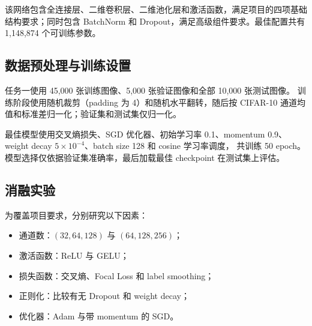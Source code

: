 \documentclass[UTF8,11pt,a4paper]{ctexart}
\begin{document}
该网络包含全连接层、二维卷积层、二维池化层和激活函数，满足项目的四项基础
结构要求；同时包含 BatchNorm 和 Dropout，满足高级组件要求。最佳配置共有
1,148,874 个可训练参数。

\subsection{数据预处理与训练设置}

任务一使用 45,000 张训练图像、5,000 张验证图像和全部 10,000 张测试图像。
训练阶段使用随机裁剪（padding 为 4）和随机水平翻转，随后按 CIFAR-10
通道均值和标准差归一化；验证集和测试集仅归一化。

最佳模型使用交叉熵损失、SGD 优化器、初始学习率 0.1、momentum 0.9、
weight decay $5\times10^{-4}$、batch size 128 和 cosine 学习率调度，
共训练 50 epoch。模型选择仅依据验证集准确率，最后加载最佳 checkpoint
在测试集上评估。

\subsection{消融实验}

为覆盖项目要求，分别研究以下因素：
\begin{itemize}
  \item 通道数：$(32,64,128)$ 与 $(64,128,256)$；
  \item 激活函数：ReLU 与 GELU；
  \item 损失函数：交叉熵、Focal Loss 和 label smoothing；
  \item 正则化：比较有无 Dropout 和 weight decay；
  \item 优化器：Adam 与带 momentum 的 SGD。
\end{itemize}

\begin{table}[H]
  \centering
  \caption{任务一实验结果。除特别注明外，均使用通道数
  $(64,128,256)$、BatchNorm 和 Dropout。}
\end{table}
\end{document}
